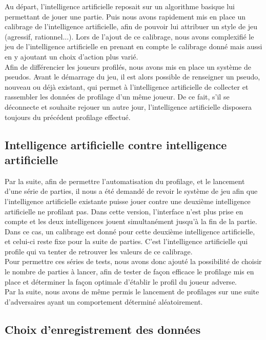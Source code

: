 \documentclass{report}
\begin{document}
Au départ, l'intelligence artificielle reposait sur un algorithme basique lui permettant de jouer une partie. Puis nous avons rapidement mis en place un calibrage de l'intelligence artificielle, afin de pouvoir lui attribuer un style de jeu (agressif, rationnel...). Lors de l'ajout de ce calibrage, nous avons complexifié le jeu de l'intelligence artificielle en prenant en compte le calibrage donné mais aussi en y ajoutant un choix d'action plus varié.\\

Afin de différencier les joueurs profilés, nous avons mis en place un système de pseudos. Avant le démarrage du jeu, il est alors possible de renseigner un pseudo, nouveau ou déjà existant, qui permet à l'intelligence artificielle de collecter et rassembler les données de profilage d'un même joueur. De ce fait, s'il se déconnecte et souhaite rejouer un autre jour, l'intelligence artificielle disposera toujours du précédent profilage effectué.\par

\subsection{Intelligence artificielle contre intelligence artificielle}
\hspace{0.5cm}Par la suite, afin de permettre l'automatisation du profilage, et le lancement d'une série de parties, il nous a été demandé de revoir le système de jeu afin que l'intelligence artificielle existante puisse jouer contre une deuxième intelligence artificielle ne profilant pas. Dans cette version, l'interface n'est plus prise en compte et les deux intelligences jouent simultanément jusqu'à la fin de la partie. Dans ce cas, un calibrage est donné pour cette deuxième intelligence artificielle, et celui-ci reste fixe pour la suite de parties. C'est l'intelligence artificielle qui profile qui va tenter de retrouver les valeurs de ce calibrage.\\

Pour permettre ces séries de tests, nous avons donc ajouté la possibilité de choisir le nombre de parties à lancer, afin de tester de façon efficace le profilage mis en place et déterminer la façon optimale d'établir le profil du joueur adverse.\\

Par la suite, nous avons de même permis le lancement de profilages sur une suite d'adversaires ayant un comportement déterminé aléatoirement.

\subsection{Choix d'enregistrement des données}
\end{document}
